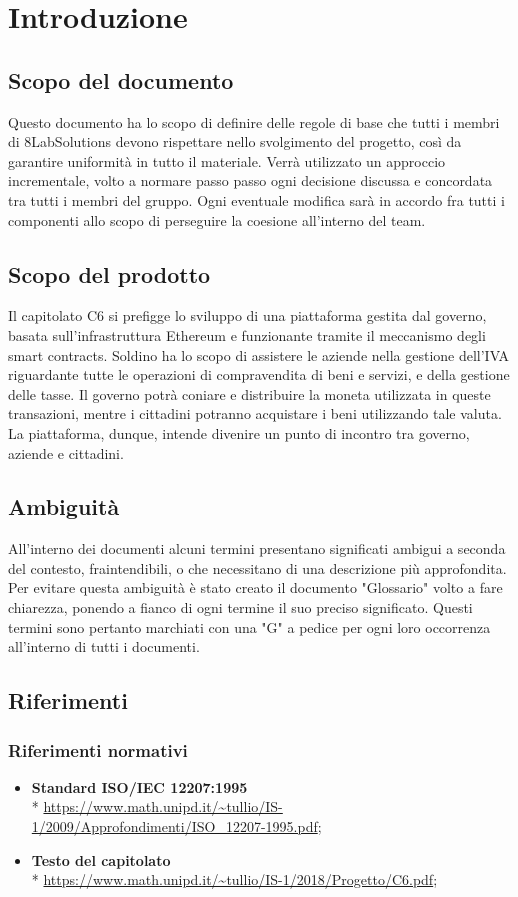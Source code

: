\section{Introduzione}
\subsection{Scopo del documento}
Questo documento ha lo scopo di definire delle regole di base che tutti i membri di 8LabSolutions devono rispettare nello svolgimento del progetto, così da garantire uniformità in tutto il materiale. Verrà utilizzato un approccio incrementale, volto a normare passo passo ogni decisione discussa e concordata tra tutti i membri del gruppo. Ogni eventuale modifica sarà in accordo fra tutti i componenti allo scopo di perseguire la coesione all'interno del team.
\subsection{Scopo del prodotto}
Il capitolato C6 si prefigge lo sviluppo di una piattaforma gestita dal governo, basata sull'infrastruttura Ethereum e funzionante tramite il meccanismo degli smart contracts. Soldino ha lo scopo di assistere le aziende nella gestione dell'IVA riguardante tutte le operazioni di compravendita di beni e servizi, e della gestione delle tasse. Il governo potrà coniare e distribuire la moneta utilizzata in queste transazioni, mentre i cittadini potranno acquistare i beni utilizzando tale valuta. La piattaforma, dunque, intende divenire un punto di incontro tra governo, aziende e cittadini.
\subsection{Ambiguità}
All’interno dei documenti alcuni termini presentano significati ambigui  a  seconda del contesto, fraintendibili, o che necessitano di una descrizione più approfondita. Per evitare questa ambiguità è stato creato il documento "Glossario" volto a fare chiarezza, ponendo a fianco di ogni termine il suo preciso significato. Questi termini sono pertanto marchiati con una "G" a pedice per ogni loro occorrenza all'interno di tutti i documenti.
\subsection{Riferimenti}
\subsubsection{Riferimenti normativi}
\begin{itemize}
\item \textbf{Standard ISO/IEC 12207:1995} \\* 
\url{https://www.math.unipd.it/~tullio/IS-1/2009/Approfondimenti/ISO_12207-1995.pdf};
\item \textbf{Testo del capitolato} \\*  \url{https://www.math.unipd.it/~tullio/IS-1/2018/Progetto/C6.pdf};
\end{itemize}
